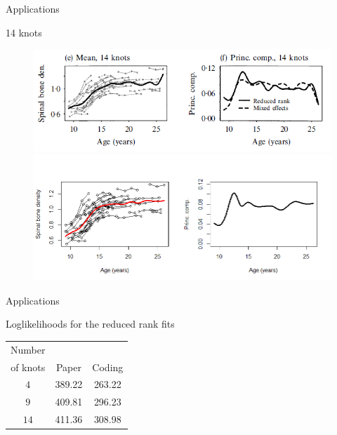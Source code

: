 \documentclass{beamer}
\begin{document}
\begin{frame}{Applications}
	\begin{block}{14 knots}
		\begin{figure}[h] %
			\begin{center}
				\includegraphics[width=0.8\linewidth]{img/14knots_true.png}
				\includegraphics[width=0.8\linewidth]{img/14knots.png}
			\end{center}
			\label{fig:long}
			\label{fig:onecol}
		\end{figure}
	\end{block}
\end{frame}

\begin{frame}{Applications}
	\begin{block}{Loglikelihoods for the reduced rank fits}
		\begin{table}[ht]
			\centering
			\begin{tabular}{ccc}
				\hline
				Number \\of knots& Paper & Coding \\ 
				\hline
				$4$ & 389.22 & 263.22 \\ 
				$9$ & 409.81 & 296.23 \\ 
				$14$ & 411.36 & 308.98 \\ 
				\hline
			\end{tabular}
		\end{table}
	\end{block}
\end{frame}


\appendix
\end{document}
